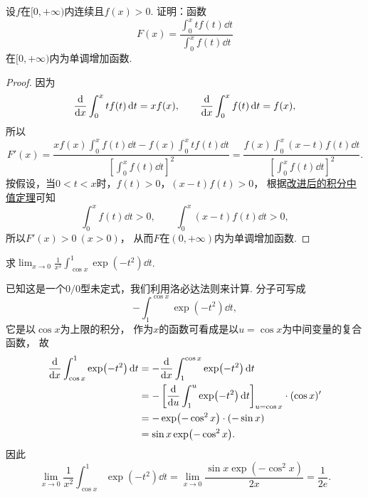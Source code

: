 \begin{example}
\def\fu{\displaystyle \int_0^x t f(t) \dd{t}}
\def\fv{\displaystyle \int_0^x f(t) \dd{t}}
\def\fvv{\left[ \fv \right]^2}
\def\fw{\displaystyle \int_0^x (x-t) f(t) \dd{t}}
设\(f\)在\([0,+\infty)\)内连续且\(f(x) > 0\).
证明：函数\begin{equation*}
	F(x) = \frac{\fu}{\fv}
\end{equation*}在\([0,+\infty)\)内为单调增加函数.
\begin{proof}
因为\begin{equation*}
	\dv{x} \fu = x f(x),
	\qquad
	\dv{x} \fv = f(x),
\end{equation*}
所以\begin{equation*}
	F'(x) = \frac{x f(x) \fv - f(x) \fu}{\fvv}
	= \frac{f(x) \fw}{\fvv}.
\end{equation*}
按假设，当\(0 < t < x\)时，\(f(t) > 0\)，\((x-t) f(t) > 0\)，
根据\hyperref[theorem:定积分.积分中值定理1推论2改进]{改进后的积分中值定理}可知\begin{equation*}
	\fv > 0, \qquad \fw > 0,
\end{equation*}
所以\(F'(x) > 0\ (x > 0)\)，
从而\(F\)在\((0,+\infty)\)内为单调增加函数.
\end{proof}
\end{example}

\begin{example}
求\(\lim_{x\to0} \frac1{x^2} \int_{\cos x}^1 \exp(-t^2) \dd{t}\).
\begin{solution}
已知这是一个\(0/0\)型未定式，我们利用洛必达法则来计算.
分子可写成\begin{equation*}
	- \int_1^{\cos x} \exp(-t^2) \dd{t},
\end{equation*}
它是以\(\cos x\)为上限的积分，
作为\(x\)的函数可看成是以\(u = \cos x\)为中间变量的复合函数，
故\begin{align*}
	\dv{x} \int_{\cos x}^1 \exp(-t^2) \dd{t}
	&= -\dv{x} \int_1^{\cos x} \exp(-t^2) \dd{t} \\
	&= -\left[ \dv{u}\int_1^u \exp(-t^2) \dd{t} \right]_{u=\cos x} \cdot (\cos x)' \\
	&= -\exp(-\cos^2 x) \cdot (-\sin x) \\
	&= \sin x \exp(-\cos^2 x).
\end{align*}
因此\begin{equation*}
	\lim_{x\to0} \frac1{x^2} \int_{\cos x}^1 \exp(-t^2) \dd{t}
	= \lim_{x\to0} \frac{\sin x \exp(-\cos^2 x)}{2x}
	= \frac1{2e}.
\end{equation*}
\end{solution}
\end{example}

